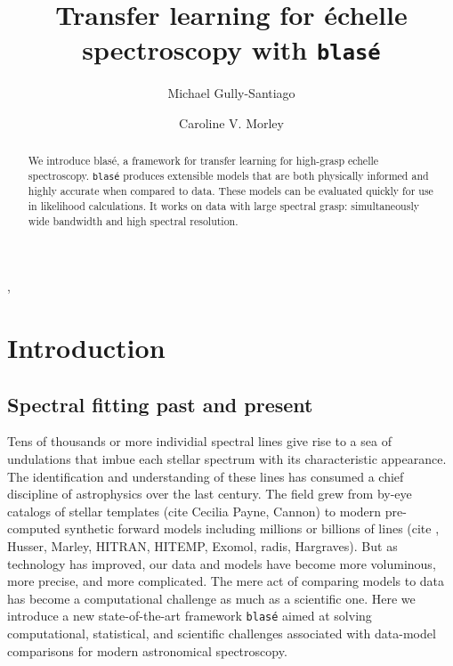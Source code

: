 \documentclass[modern]{aastex631}
\begin{document}
\title{Transfer learning for \'echelle spectroscopy with \texttt{blas\'e}}

\author{Michael Gully-Santiago}

\author{Caroline V. Morley}

\begin{abstract}

 We introduce blas\'e, a framework for transfer learning for high-grasp echelle spectroscopy.  \texttt{blas\'e} produces extensible models that are both physically informed and highly accurate when compared to data. These models can be evaluated quickly for use in likelihood calculations. It works on data with large spectral grasp: simultaneously wide bandwidth and high spectral resolution.


\end{abstract}

, 

\section{Introduction}\label{sec:intro}

\subsection{Spectral fitting past and present}

Tens of thousands or more individial spectral lines give rise to a sea of undulations that imbue each stellar spectrum with its characteristic appearance.  The identification and understanding of these lines has consumed a chief discipline of astrophysics over the last century.  The field grew from by-eye catalogs of stellar templates (cite  Cecilia Payne, Cannon) to modern pre-computed synthetic forward models including millions or billions of lines (cite , Husser, Marley, HITRAN, HITEMP, Exomol, radis, Hargraves).  But as technology has improved, our data and models have become more voluminous, more precise, and more complicated.  The mere act of comparing models to data has become a computational challenge as much as a scientific one.  Here we introduce a new state-of-the-art framework \texttt{blas\'e} aimed at solving computational, statistical, and scientific challenges associated with data-model comparisons for modern astronomical spectroscopy.
\end{document}
